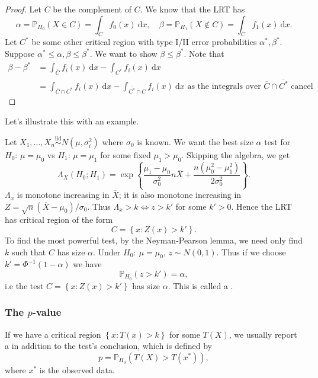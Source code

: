 \documentclass[egregdoesnotlikesansseriftitles,a4paper]{scrartcl}
\begin{document}
\begin{proof}
      Let $\overline{C}$ be the complement of $C$. We know that the LRT has \[
      \alpha =\mathbb{P}_{H_0 } (X \in C) =\int_{C}^{}f_{0} (x) \ \mathrm{d} x, \quad \beta  =\mathbb{P}_{H_1 } (X \notin C) =\int_{\overline{C}}^{}f_{1} (x) \ \mathrm{d} x
      .\] Let $C^{*}$ be some other critical region with type I/II error probabilities $\alpha ^* ,\beta ^* $. Suppose $\alpha ^* \leq \alpha , \beta  \leq \beta ^*$. We want to show $\beta  \leq \beta ^*$. Note that
      \begin{align*}
          \beta -\beta ^* &= \int_{\overline{C}}^{}f_{i}(x) \ \mathrm{d}x - \int_{\overline{C^*}}^{}f_{i}(x) \ \mathrm{d}x \\
          &=\int_{\overline{C}\cap C^*}^{}f_{i}(x) \ \mathrm{d}x - \int_{\overline{C^*}\cap C}^{}f_{i}(x) \ \mathrm{d}x \text{ as the integrals over } \overline{C}\cap \overline{C^*} \text{ cancel }
      \end{align*}
\end{proof}
Let's illustrate this with an example.
\begin{example*}
      Let $X_1 , \ldots, X_{n} \overset{\operatorname{iid}}{\sim}N (\mu ,\sigma_i ^2) $ where $\sigma_0 $ is known. We want the best size $\alpha $ test for $H_0 $: $\mu =\mu_0 $ vs $H_1 $: $\mu =\mu_1 $ for some fixed $\mu_1 > \mu_0 $. Skipping the algebra, we get \[
      \Lambda_{X}(H_0 ; H_1 )= \exp \left\{ \frac{\mu_1 -\mu_0 }{\sigma_0^2}n \overline{X} + \frac{n (\mu_0^2 -\mu_1^2 )}{2\sigma_0 ^2}\right\}
      .\] $\Lambda_{x}$ is monotone increasing in $\overline{X}$; it is also monotone increasing in $Z= \sqrt{n} (\overline{X}-\mu_0 )/\sigma_{0}$. Thus $\Lambda_{x}>k \iff z>k'$ for some $k'>0$. Hence the LRT has critical region of the form \[
      C=\left\{x: Z (x)>k'\right\}
      .\]  To find the most powerful test, by the Neyman-Pearson lemma, we need only find $k$ such that $C$ has size $\alpha$. Under $H_0 : \ \mu=\mu_0 $, $z \sim N (0,1)$. Thus if we choose $k' =\Phi^{-1}(1-\alpha)$ we have \[
      \mathbb{P}_{H_0 }(z>k' )=\alpha
      ,\] i.e the test $C=\left\{x: Z (x)>k'\right\}$ has size $\alpha$. This is called a .
\end{example*}
\subsubsection*{The $p$-value}
If we have a critical region $\left\{x: T (x)>k\right\}$ for some  $T (X)$, we usually report a  in addition to the test's conclusion, which is defined by \[
p=\mathbb{P}_{H_0 }(T (X)>T (x^*))
,\] where $x^*$ is the observed data. 
\end{document}
